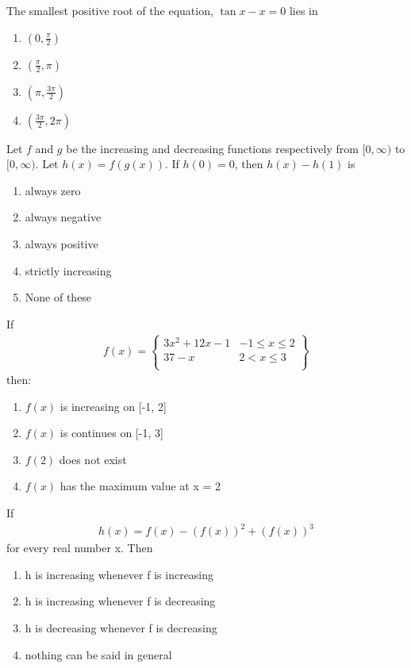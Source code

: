 \item The smallest positive root of the equation, $\tan x - x = 0$ lies in
\begin{enumerate}
\item $(0, \frac{\pi}{2})$
\item $(\frac{\pi}{2}, \pi)$
\item $(\pi, \frac{3\pi}{2})$
\item $(\frac{3\pi}{2}, 2\pi)$
\end{enumerate}

\item Let $f$ and $g$ be the increasing and decreasing functions respectively from $[0, \infty)$ to $[0, \infty)$. Let $h(x) = f(g(x))$. If $h(0) = 0$, then $h(x) - h(1)$ is
\begin{enumerate}
\item always zero
\item always negative
\item always positive
\item strictly increasing
\item None of these
\end{enumerate}

\item If 
\begin{align*}
f(x)=
\left\lbrace
\begin{array}{ll} 
      3x^2 + 12x - 1 &  -1 \leq x \leq 2\\
      37 - x & 2 < x \leq 3\\
\end{array}
\right\rbrace
\end{align*}
then:
\begin{enumerate}
\item $f(x)$ is increasing on [-1, 2]
\item $f(x)$ is continues on [-1, 3]
\item $f(2)$ does not exist
\item $f(x)$ has the maximum value at x = 2
\end{enumerate}

\item If 
\begin{align*}
h(x) = f(x) - (f(x))^2 + (f(x))^3
\end{align*}
for every real number x. Then 
\begin{enumerate}
\item h is increasing whenever f is increasing
\item h is increasing whenever f is decreasing
\item h is decreasing whenever f is decreasing
\item nothing can be said in general
\end{enumerate}

